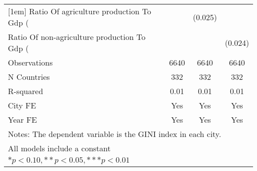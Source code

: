 {\begin{tabular}{l*{3}{c}}
[1em]
Ratio Of agriculture production To Gdp (%
                    &                     &     (0.025)         &                     \\
[1em]
Ratio Of non-agriculture production To Gdp (%
                    &                     &                     &     (0.024)         \\
\hline
Observations        &        6640         &        6640         &        6640         \\
N Countries         &         332         &         332         &         332         \\
R-squared           &        0.01         &        0.01         &        0.01         \\
City FE             &         Yes         &         Yes         &         Yes         \\
Year FE             &         Yes         &         Yes         &         Yes         \\
\hline\hline
\multicolumn{4}{l}{\footnotesize Notes: The dependent variable is the GINI index in each city.}\\
\multicolumn{4}{l}{\footnotesize All models include a constant}\\
\multicolumn{4}{l}{\footnotesize $* p<0.10, ** p<0.05, *** p<0.01$}\\
\end{tabular}
}
